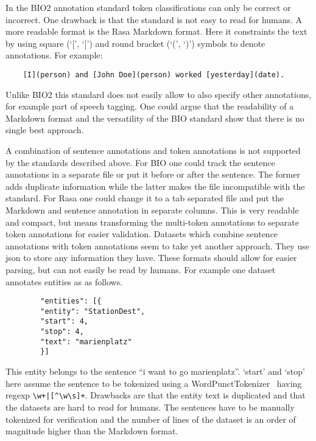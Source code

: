 In the BIO2 annotation standard token classifications can only be correct or incorrect.
One drawback is that the standard is not easy to read for humans.
A more readable format is the Rasa Markdown format.
Here it constraints the text by using square (`[', `]') and round bracket (`(', `)') symbols to denote annotations.
For example:
\begin{center}
    \begin{verbatim}
    [I](person) and [John Doe](person) worked [yesterday](date).
    \end{verbatim}
\end{center}
Unlike BIO2 this standard does not easily allow to also specify other annotations, for example part of speech tagging.
One could argue that the readability of a Markdown format and the versatility of the BIO standard show that there is no single best approach.

A combination of sentence annotations and token annotations is not supported by the standards described above.
For BIO one could track the sentence annotations in a separate file or put it before or after the sentence.
The former adds duplicate information while the latter makes the file incompatible with the standard.
For Rasa one could change it to a tab separated file and put the Markdown and sentence annotation in separate columns.
This is very readable and compact, but means transforming the multi-token annotations to separate token annotations for easier validation.
Datasets which combine sentence annotations with token annotations seem to take yet another approach.
They use json to store any information they have.
These formats should allow for easier parsing, but can not easily be read by humans.
For example one dataset annotates entities as as follows.
\begin{center}
    \begin{verbatim}
        "entities": [{
        "entity": "StationDest",
        "start": 4,
        "stop": 4,
        "text": "marienplatz"
        }]
    \end{verbatim}
\end{center}
This entity belongs to the sentence ``i want to go marienplatz''.
`start' and `stop' here assume the sentence to be tokenized using a WordPunctTokenizer~\citep{bird2004nltk} having regexp \verb/\w+|[^\w\s]+/.
Drawbacks are that the entity text is duplicated and that the datasets are hard to read for humans.
The sentences have to be manually tokenized for verification and the number of lines of the dataset is an order of magnitude higher than the Markdown format.

